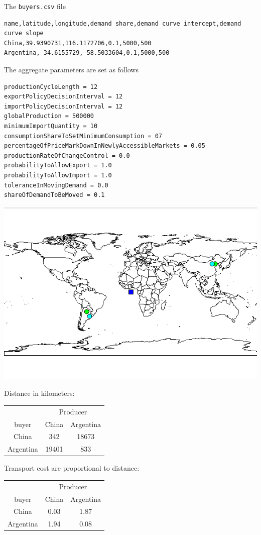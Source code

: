 \documentclass{article}
\begin{document}
The \verb+buyers.csv+ file
\begin{verbatim}
name,latitude,longitude,demand share,demand curve intercept,demand curve slope
China,39.9390731,116.1172706,0.1,5000,500
Argentina,-34.6155729,-58.5033604,0.1,5000,500
\end{verbatim}

The aggregate parameters are set as follows

\begin{verbatim}
productionCycleLength = 12
exportPolicyDecisionInterval = 12
importPolicyDecisionInterval = 12
globalProduction = 500000
minimumImportQuantity = 10
consumptionShareToSetMinimumConsumption = 07
percentageOfPriceMarkDownInNewlyAccessibleMarkets = 0.05
productionRateOfChangeControl = 0.0
probabilityToAllowExport = 1.0
probabilityToAllowImport = 1.0
toleranceInMovingDemand = 0.0
shareOfDemandToBeMoved = 0.1
\end{verbatim}


\includegraphics[scale=0.6]{fig_case1_map}

Distance in kilometers:

\vskip2mm
\begin{tabular}{c | c  c }
	& \multicolumn{2}{c}{Producer}\\
	buyer & China&Argentina\\
	\hline
	China & 342&18673\\
	\hline
	Argentina & 19401&833\\
	\hline
\end{tabular}

\vskip4mm
Transport cost are proportional to distance:

\vskip2mm
\begin{tabular}{c | c  c }
	& \multicolumn{2}{c}{Producer}\\
	buyer & China&Argentina\\
	\hline
	China & 0.03&1.87\\
	\hline
	Argentina & 1.94&0.08\\
	\hline
\end{tabular}
\end{document}
